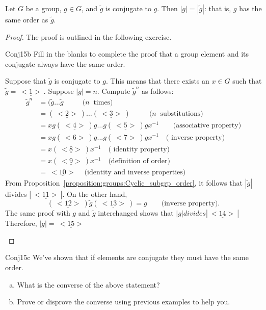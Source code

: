 \begin{prop}{} Let $G$ be a group, $g \in G$, and $\tilde{g}$ is conjugate to $g$. Then $|g| = |\tilde{g}|$: that is,  $g$ has the same order as $\tilde{g}$.
\end{prop}

\begin{proof}  The proof is outlined in the following exercise.

\begin{exercise}{Conj15b}
Fill in the blanks to complete the proof that a group element and its conjugate always have the same order.

Suppose that $\tilde{g}$ is conjugate to $g$. This means that there exists an $x\in G$ such that $\tilde{g}=\underline{~<1>~}$. Suppose $|g|=n$. Compute $\tilde{g}^n$ as follows:
\begin{align*}
 \tilde{g}^n&=(\tilde{g} \ldots \tilde{g}~~~~~~~~~~~~(n~\text{ times)}\\ 
&=(\underline{~<2>~}) \ldots (\underline{~<3>~})~~~~~~~~~~~~(n~\text{ substitutions)}\\ 
& =xg(\underline{~<4>~})g \ldots g(\underline{~<5>~})gx^{-1}\qquad\text{(associative property)}\\
&=xg(\underline{~<6>~})g...g(\underline{~<7>~})gx^{-1}\quad\text{( inverse property)}\\
&=x(\underline{~<8>~})x^{-1}\quad\text{( identity property)}\\
&=x(\underline{~<9>~})x^{-1}\quad\text{(definition of order)}\\
&=\underline{~<10>~}\quad\text{(identity and inverse properties)}
\end{align*}
\noindent
From Proposition~\ref{proposition:groups:Cyclic_subgrp_order}, it follows that  $| \tilde{g}|$ divides $|\underline{~<11>~}|$. On the other hand, \[(\underline{~<12>~})\tilde{g}(\underline{~<13>~})=g\qquad\text{(inverse property)}.\]  
The same proof  with $g$ and $\tilde{g}$ interchanged shows that $|g|divides |\underline{~<14>~}|$ Therefore,  $|g|=\underline{~<15>~}$ 
\end {exercise}
\end{proof}

\begin{exercise}{Conj15c}
We've shown that if elements are conjugate they must have the same order.
\begin{enumerate}[(a)]
\item What is the converse of the above statement?
\item Prove or disprove the converse using previous examples to help you.
\end{enumerate}
\end {exercise}
 
